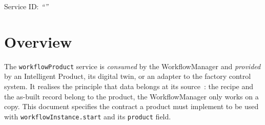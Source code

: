\documentclass[a4paper]{arrowhead}
\begin{document}
\ArrowheadSetup

\begin{center}
  \vspace*{1cm}
  \huge{\arrowtitle}

  \vspace*{0.2cm}
  \LARGE{\arrowtype}
  \vspace*{1cm}

  \Large{Service ID: \textit{``\arrowid''}}
  \vspace*{\fill}

  

  \vspace*{1cm}
  \vspace*{\fill}

  \begin{abstract}
    This document describes the \texttt{workflow\allowbreak{}Product} service of the Eclipse Arrowhead workflow support systems, which lets a WorkflowManager retrieve a product's recipe fragment and store the results back. It is provided by an Intelligent Product (consumed by the WorkflowManager), service version 1.0.0, documentation edition 5.4.0.
  \end{abstract}

  \vspace*{1cm}
\end{center}

\newpage

\tableofcontents
\newpage

\section{Overview}
\label{sec:overview}
The \texttt{workflow\allowbreak{}Product} service is \emph{consumed} by the WorkflowManager and \emph{provided}
by an Intelligent Product, its digital twin, or an adapter to the factory control system. It realises the principle
that data belongs at its source~\cite{derhamy2018}: the recipe and the as-built record belong to the product, the
WorkflowManager only works on a copy. This document specifies the contract a product must implement to be used with
\texttt{workflow\allowbreak{}Instance.\allowbreak{}start} and its \texttt{product} field.
\end{document}
